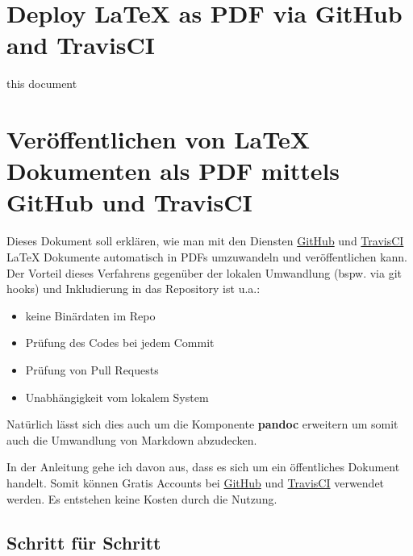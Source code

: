 \documentclass[]{article}
\date{}
\providecommand{\tightlist}{
  \setlength{\itemsep}{0pt}\setlength{\parskip}{0pt}}
\begin{document}
\section{Deploy LaTeX as PDF via GitHub and
TravisCI}\label{deploy-latex-as-pdf-via-github-and-travisci}

this document

\section{Veröffentlichen von LaTeX Dokumenten als PDF mittels GitHub und
TravisCI}\label{veruxf6ffentlichen-von-latex-dokumenten-als-pdf-mittels-github-und-travisci}

Dieses Dokument soll erklären, wie man mit den Diensten
\href{https://github.com/}{GitHub} und
\href{https://travis-ci.org/}{TravisCI} LaTeX Dokumente automatisch in
PDFs umzuwandeln und veröffentlichen kann. Der Vorteil dieses Verfahrens
gegenüber der lokalen Umwandlung (bspw. via git hooks) und Inkludierung
in das Repository ist u.a.:

\begin{itemize}
\tightlist
\item
  keine Binärdaten im Repo
\item
  Prüfung des Codes bei jedem Commit
\item
  Prüfung von Pull Requests
\item
  Unabhängigkeit vom lokalem System
\end{itemize}

Natürlich lässt sich dies auch um die Komponente \textbf{pandoc}
erweitern um somit auch die Umwandlung von Markdown abzudecken.

In der Anleitung gehe ich davon aus, dass es sich um ein öffentliches
Dokument handelt. Somit können Gratis Accounts bei
\href{https://github.com/}{GitHub} und
\href{https://travis-ci.org/}{TravisCI} verwendet werden. Es entstehen
keine Kosten durch die Nutzung.

\subsection{Schritt für Schritt}\label{schritt-fuxfcr-schritt}
\end{document}
